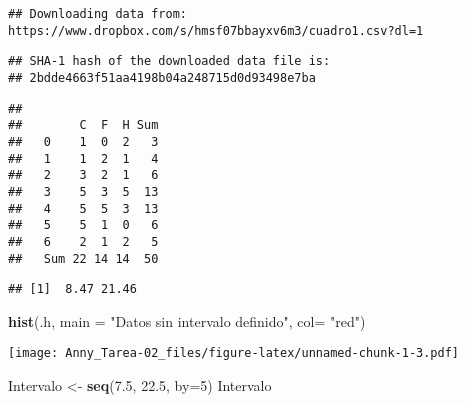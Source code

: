\documentclass[
]{article}
\newenvironment{Shaded}{\begin{snugshade}}{\end{snugshade}}
\newcommand{\CommentTok}[1]{\textcolor[rgb]{0.56,0.35,0.01}{\textit{#1}}}
\newcommand{\DataTypeTok}[1]{\textcolor[rgb]{0.13,0.29,0.53}{#1}}
\newcommand{\DecValTok}[1]{\textcolor[rgb]{0.00,0.00,0.81}{#1}}
\newcommand{\FloatTok}[1]{\textcolor[rgb]{0.00,0.00,0.81}{#1}}
\newcommand{\KeywordTok}[1]{\textcolor[rgb]{0.13,0.29,0.53}{\textbf{#1}}}
\newcommand{\NormalTok}[1]{#1}
\newcommand{\OperatorTok}[1]{\textcolor[rgb]{0.81,0.36,0.00}{\textbf{#1}}}
\newcommand{\StringTok}[1]{\textcolor[rgb]{0.31,0.60,0.02}{#1}}
\begin{document}
\begin{verbatim}
## Downloading data from: https://www.dropbox.com/s/hmsf07bbayxv6m3/cuadro1.csv?dl=1
\end{verbatim}

\begin{verbatim}
## SHA-1 hash of the downloaded data file is:
## 2bdde4663f51aa4198b04a248715d0d93498e7ba
\end{verbatim}

\begin{Shaded}
\end{Shaded}

\begin{verbatim}
##      
##        C  F  H Sum
##   0    1  0  2   3
##   1    1  2  1   4
##   2    3  2  1   6
##   3    5  3  5  13
##   4    5  5  3  13
##   5    5  1  0   6
##   6    2  1  2   5
##   Sum 22 14 14  50
\end{verbatim}

\begin{Shaded}
\end{Shaded}

\begin{verbatim}
## [1]  8.47 21.46
\end{verbatim}

\begin{Shaded}
\begin{Highlighting}[]
\KeywordTok{hist}\NormalTok{(.h, }\DataTypeTok{main =} \StringTok{"Datos sin intervalo definido"}\NormalTok{, }\DataTypeTok{col=} \StringTok{"red"}\NormalTok{)}
\end{Highlighting}
\end{Shaded}

\texttt{[image: Anny\_Tarea-02\_files/figure-latex/unnamed-chunk-1-3.pdf]}

\begin{Shaded}
\begin{Highlighting}[]
\NormalTok{Intervalo <-}\StringTok{ }\KeywordTok{seq}\NormalTok{(}\FloatTok{7.5}\NormalTok{, }\FloatTok{22.5}\NormalTok{, }\DataTypeTok{by=}\DecValTok{5}\NormalTok{) }
\NormalTok{Intervalo }
\end{Highlighting}
\end{Shaded}
\end{document}
